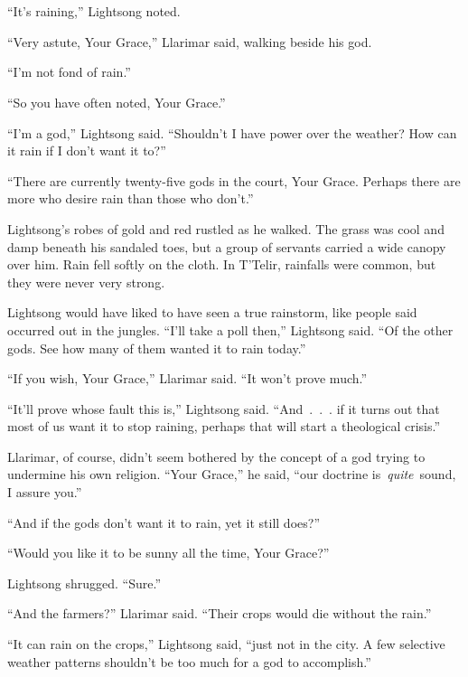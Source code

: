 \chapter{}

“It’s raining,” Lightsong noted.

“Very astute, Your Grace,” Llarimar said, walking beside his god.

“I’m not fond of rain.”

“So you have often noted, Your Grace.”

“I’m a god,” Lightsong said. “Shouldn’t I have power over the weather? How can it rain if I don’t want it to?”

“There are currently twenty-five gods in the court, Your Grace. Perhaps there are more who desire rain than those who don’t.”

Lightsong’s robes of gold and red rustled as he walked. The grass was cool and damp beneath his sandaled toes, but a group of servants carried a wide canopy over him. Rain fell softly on the cloth. In T’Telir, rainfalls were common, but they were never very strong.

Lightsong would have liked to have seen a true rainstorm, like people said occurred out in the jungles. “I’ll take a poll then,” Lightsong said. “Of the other gods. See how many of them wanted it to rain today.”

“If you wish, Your Grace,” Llarimar said. “It won’t prove much.”

“It’ll prove whose fault this is,” Lightsong said. “And~.~.~. if it turns out that most of us want it to stop raining, perhaps that will start a theological crisis.”

Llarimar, of course, didn’t seem bothered by the concept of a god trying to undermine his own religion. “Your Grace,” he said, “our doctrine is~\textit{quite}~sound, I assure you.”

“And if the gods don’t want it to rain, yet it still does?”

“Would you like it to be sunny all the time, Your Grace?”

Lightsong shrugged. “Sure.”

“And the farmers?” Llarimar said. “Their crops would die without the rain.”

“It can rain on the crops,” Lightsong said, “just not in the city. A few selective weather patterns shouldn’t be too much for a god to accomplish.”

